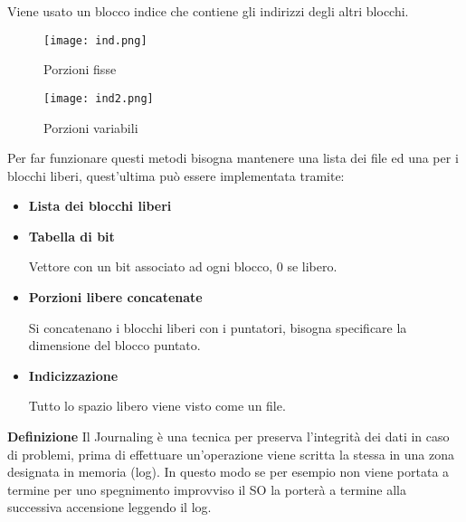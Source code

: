 \documentclass{article}
\begin{document}
\begin{itemize}
        Viene usato un blocco indice che contiene gli indirizzi degli altri blocchi.\newline

        \begin{figure}[ht]
            \begin{minipage}[t]{0.5\textwidth}
                \centering
                \texttt{[image: ind.png]}
                \caption*{Porzioni fisse}
            \end{minipage}
            \vrule width 1pt\hspace{0.5em}
            \hfill
            \begin{minipage}[t]{0.5\textwidth}
                \centering
                \texttt{[image: ind2.png]}
                \caption*{Porzioni variabili}
            \end{minipage}
        \end{figure}
    
\end{itemize}

\noindent Per far funzionare questi metodi bisogna mantenere una lista dei file ed una per i blocchi liberi, quest'ultima può essere implementata tramite:
\begin{itemize}
    \item \textbf{Lista dei blocchi liberi}
    \item \textbf{Tabella di bit}

        Vettore con un bit associato ad ogni blocco, 0 se libero.
    
    \item \textbf{Porzioni libere concatenate}

        Si concatenano i blocchi liberi con i puntatori, bisogna specificare la dimensione del blocco puntato.
    
    \item \textbf{Indicizzazione}

        Tutto lo spazio libero viene visto come un file.\newline
    
\end{itemize}

\noindent\textbf{Definizione} Il Journaling è una tecnica per preserva l'integrità dei dati in caso di problemi, prima di effettuare un'operazione viene scritta la stessa in una zona designata in memoria (log). In questo modo se per esempio non viene portata a termine per uno spegnimento improvviso il SO la porterà a termine alla successiva accensione leggendo il log.
\end{document}
